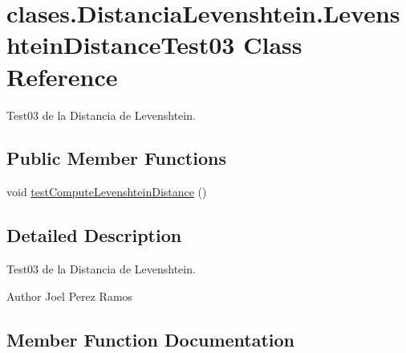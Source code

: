 \hypertarget{classclases_1_1_distancia_levenshtein_1_1_levenshtein_distance_test03}{}\section{clases.\+Distancia\+Levenshtein.\+Levenshtein\+Distance\+Test03 Class Reference}
\label{classclases_1_1_distancia_levenshtein_1_1_levenshtein_distance_test03}


Test03 de la Distancia de Levenshtein.  


\subsection*{Public Member Functions}
\begin{DoxyCompactItemize}
\item 
void \hyperlink{classclases_1_1_distancia_levenshtein_1_1_levenshtein_distance_test03_afa83a142e84686e31e74757c35a8db60}{test\+Compute\+Levenshtein\+Distance} ()
\end{DoxyCompactItemize}


\subsection{Detailed Description}
Test03 de la Distancia de Levenshtein. 

\begin{DoxyAuthor}{Author}
Joel Perez Ramos 
\end{DoxyAuthor}


\subsection{Member Function Documentation}
\hypertarget{classclases_1_1_distancia_levenshtein_1_1_levenshtein_distance_test03_afa83a142e84686e31e74757c35a8db60}{}\label{classclases_1_1_distancia_levenshtein_1_1_levenshtein_distance_test03_afa83a142e84686e31e74757c35a8db60} 
